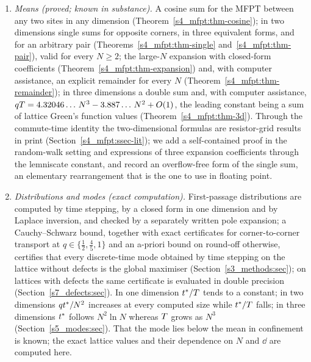 \begingroup
\renewcommand{\labelenumi}{(\roman{enumi})}
\begin{enumerate}
\item \emph{Means (proved; known in substance).} A cosine sum for the MFPT between any two sites in any dimension
(Theorem~\ref{s4_mfpt:thm-cosine}); in two dimensions single sums for opposite corners, in three equivalent forms,
and for an arbitrary pair (Theorems~\ref{s4_mfpt:thm-single} and~\ref{s4_mfpt:thm-pair}), valid for every $N\ge2$;
the large-$N$ expansion with closed-form coefficients (Theorem~\ref{s4_mfpt:thm-expansion}) and, with computer
assistance, an explicit remainder for every $N$ (Theorem~\ref{s4_mfpt:thm-remainder}); in three dimensions a double
sum and, with computer assistance, $qT=4.32046\ldots\,N^{3}-3.887\ldots\,N^{2}+O(1)$, the leading constant
being a sum of lattice Green's function values (Theorem~\ref{s4_mfpt:thm-3d}).
Through the commute-time identity the two-dimensional formulas are resistor-grid results in print
(Section~\ref{s4_mfpt:ssec-lit}); we add a self-contained proof in the random-walk setting and expressions of three
expansion coefficients through the lemniscate constant, and record an overflow-free form of the single sum, an
elementary rearrangement that is the one to use in floating point.

\item \emph{Distributions and modes (exact computation).} First-passage distributions are computed by time
stepping, by a closed form in one dimension and by Laplace inversion, and checked by a separately written pole expansion;
a Cauchy--Schwarz bound, together with exact certificates for corner-to-corner transport at $q\in\{\frac12,\frac45,1\}$
and an a-priori bound on round-off otherwise, certifies that every discrete-time mode obtained by time stepping on the
lattice without defects is the global maximiser (Section~\ref{s3_methods:sec}); on lattices with defects the same
certificate is evaluated in double precision (Section~\ref{s7_defects:sec}). In one dimension $t^{*}/T$ tends to a constant; in two dimensions $qt^{*}/N^{2}$
increases at every computed size while $t^{*}/T$ falls; in three dimensions $t^{*}$ follows $N^{2}\ln N$ whereas
$T$ grows as $N^{3}$ (Section~\ref{s5_modes:sec}). That the mode lies below the mean in confinement is known; the
exact lattice values and their dependence on $N$ and $\dd$ are computed here.


\end{enumerate}
